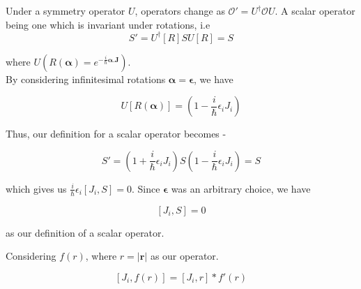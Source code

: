 \setcounter{draft}{1}







    Under a symmetry operator $U$, operators change as $\mathcal{O}' = U^{\dagger}\mathcal{O}U$. A scalar operator being one which is invariant under rotations, i.e
    \begin{equation*}
        S' = U^{\dagger}[R]SU[R] = S
    \end{equation*}

    where $U(R(\boldsymbol{\alpha}) = e^{-\frac{i}{\hbar}\boldsymbol{\alpha}.\mathbf{J}})$. \\
    By considering infinitesimal rotations $\boldsymbol{\alpha} = \boldsymbol{\epsilon}$, we have 

    \begin{equation*}
        U[R(\boldsymbol{\alpha})] = \left( 1 - \frac{i}{\hbar}\epsilon_{i}J_{i}\right)
    \end{equation*}

    Thus, our definition for a scalar operator becomes - 

    \begin{equation*}
        S' = \left( 1 + \frac{i}{\hbar}\epsilon_{i}J_{i}\right)S\left( 1 - \frac{i}{\hbar}\epsilon_{i}J_{i}\right) = S
    \end{equation*}

    which gives us $\frac{i}{\hbar}\epsilon_{i}\left[ J_{i},S \right] = 0$. Since $\boldsymbol{\epsilon}$ was an arbitrary choice, we have 

    \begin{equation*}
        \left[ J_{i},S \right] = 0
    \end{equation*}

    as our definition of a scalar operator.

    Considering $f(r)$, where $r = |\mathbf{r}|$ as our operator.

    \begin{equation*}
        \left[ J_{i},f(r) \right] = \left[ J_{i},r \right]*f'(r)
    \end{equation*}

